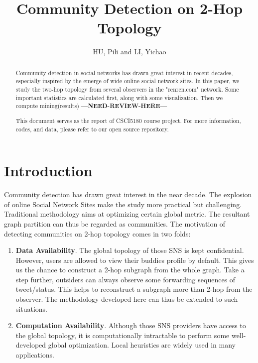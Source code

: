 \documentclass[11pt,a4paper]{article}
\author{HU, Pili and LI, Yichao}
\title{Community Detection on 2-Hop Topology}
\newcommand{\question}{\textbf{---NEED-REVIEW-HERE---}}
\begin{document}
\maketitle

\begin{abstract}
	Community detection in social networks has drawn great interest
	in recent decades, especially inspired by the emerge of wide 
	online social network sites. In this paper, we study the two-hop 
	topology from several observers in the "renren.com" network. 
	Some important statistics are calculated first, along with 
	some visualization. Then we compute mining(results)
	 \question

	This document serves as the report of CSCI5180 course 
	project\cite{csci5180_lecture,csci5180_tutorial}. 
	For more information, codes, and data, please refer to 
	our open source repository\cite{hu2011-cd2hop}. 
	
\end{abstract}

\pagebreak
\tableofcontents
\pagebreak

\section{Introduction}

Community detection has drawn great interest in the near decade. 
The explosion of online Social Network Sites make the study more 
practical but challenging. Traditional methodology aims at 
optimizing certain global metric. The resultant graph partition 
can thus be regarded as communities. The motivation of detecting 
communities on 2-hop topology comes in two folds: 
\begin{enumerate}
	\item \textbf{Data Availability}. The global topology of 
	those SNS is kept confidential. However, users are allowed 
	to view their buddies profile by default. This gives us the 
	chance to construct a 2-hop subgraph from the whole graph. 
	Take a step further, outsiders can always observe some forwarding 
	sequences of tweet/status. This helps to reconstruct a 
	subgraph more than 2-hop from the observer. The methodology 
	developed here can thus be extended to such situations. 
	\item \textbf{Computation Availability}. Although those SNS 
	providers have access to the global topology, it is computationally
	intractable to perform some well-developed global optimization. 
	Local heuristics are widely used in many applications. 
\end{enumerate}
\end{document}
